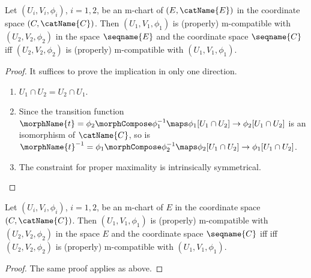 \documentclass{article}
\begin{document}
\begin{lemma}
\label{lem:M-compatsym}
Let $(U_i, V_i, \phi_i)$, $i=1,2$, be an m-chart of
$(E, \catName{E})$ in the coordinate space $(C,\catName{C})$. Then
\nobreaks
  {{
    $(U_1, V_1, \phi_1)$
  }}
is (properly) m-compatible with
\nobreaks
  {{
    $(U_2, V_2, \phi_2)$
  }}
in the space $\seqname{E}$ and the coordinate space $\seqname{C}$ iff
\nobreaks
  {{
    $(U_2, V_2, \phi_2)$
  }}
is (properly) m-compatible with
\nobreaks
  {{
    $(U_1, V_1, \phi_1)$.
  }}

\begin{proof}
It suffices to prove the implication in only one direction.
\begin{enumerate}
\item $U_1 \cap U_2 = U_2 \cap U_1$.
\item Since the transition function
\nobreaks
  {{
    $
      \morphName{t}=\phi_2 \morphCompose \phi^{-1}_1
      \maps \phi_1[U_1 \cap U_2] \to \phi_2[U_1 \cap U_2]
    $
  }}
is an isomorphism of $\catName{C}$, so is
\nobreaks
  {{
    $
      \morphName{t}^{-1} = \phi_1 \morphCompose \phi_2^{-1}
      \maps \phi_2[U_1 \cap U_2] \to \phi_1[U_1 \cap U_2]
    $.
  }}
\item The constraint for proper maximality is intrinsically symmetrical.
\end{enumerate}
\end{proof}

Let $(U_i, V_i, \phi_i)$, $i=1,2$, be an m-chart of $E$ in the
coordinate space $(C,\catName{C})$. Then $(U_1, V_1, \phi_1)$ is
(properly) m-compatible with $(U_2, V_2, \phi_2)$ in the space $E$ and
the coordinate space $\seqname{C}$ iff iff $(U_2, V_2, \phi_2)$ is
(properly) m-compatible with $(U_1, V_1, \phi_1)$.

\begin{proof}
The same proof applies as above.
\end{proof}
\end{lemma}
\end{document}
